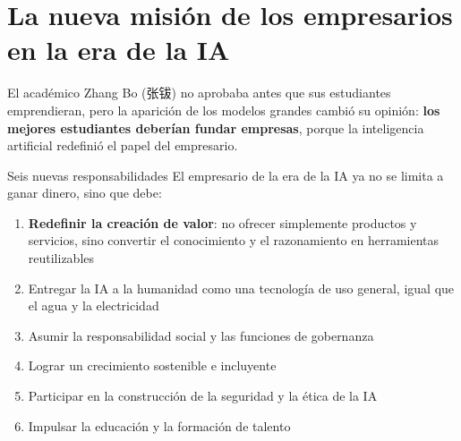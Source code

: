 \section{La nueva misión de los empresarios en la era de la IA}

El académico Zhang Bo (张钹) no aprobaba antes que sus estudiantes emprendieran, pero la aparición de los modelos grandes cambió su opinión: \textbf{los mejores estudiantes deberían fundar empresas}, porque la inteligencia artificial redefinió el papel del empresario.

\begin{importantbox}{Seis nuevas responsabilidades}
El empresario de la era de la IA ya no se limita a ganar dinero, sino que debe:
\begin{enumerate}
\item \textbf{Redefinir la creación de valor}: no ofrecer simplemente productos y servicios, sino convertir el conocimiento y el razonamiento en herramientas reutilizables
\item Entregar la IA a la humanidad como una tecnología de uso general, igual que el agua y la electricidad
\item Asumir la responsabilidad social y las funciones de gobernanza
\item Lograr un crecimiento sostenible e incluyente
\item Participar en la construcción de la seguridad y la ética de la IA
\item Impulsar la educación y la formación de talento
\end{enumerate}
\end{importantbox}

